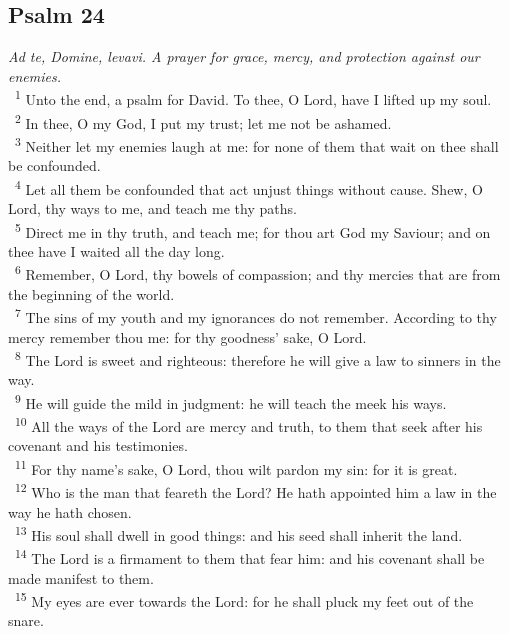 \documentclass[a5paper,12pt]{article}
\begin{document}
\begin{multicols*}{2}
\section{Psalm 24}
\label{sec:org667a478}
\emph{Ad te, Domine, levavi. A prayer for grace, mercy, and protection against our enemies.}\\

~\textsuperscript{1} Unto the end, a psalm for David. To thee, O Lord, have I lifted up my soul.\\
~\textsuperscript{2} In thee, O my God, I put my trust; let me not be ashamed.\\
~\textsuperscript{3} Neither let my enemies laugh at me: for none of them that wait on thee shall be confounded.\\
~\textsuperscript{4} Let all them be confounded that act unjust things without cause. Shew, O Lord, thy ways to me, and teach me thy paths.\\
~\textsuperscript{5} Direct me in thy truth, and teach me; for thou art God my Saviour; and on thee have I waited all the day long.\\
~\textsuperscript{6} Remember, O Lord, thy bowels of compassion; and thy mercies that are from the beginning of the world.\\
~\textsuperscript{7} The sins of my youth and my ignorances do not remember. According to thy mercy remember thou me: for thy goodness' sake, O Lord.\\
~\textsuperscript{8} The Lord is sweet and righteous: therefore he will give a law to sinners in the way.\\
~\textsuperscript{9} He will guide the mild in judgment: he will teach the meek his ways.\\
~\textsuperscript{10} All the ways of the Lord are mercy and truth, to them that seek after his covenant and his testimonies.\\
~\textsuperscript{11} For thy name's sake, O Lord, thou wilt pardon my sin: for it is great.\\
~\textsuperscript{12} Who is the man that feareth the Lord? He hath appointed him a law in the way he hath chosen.\\
~\textsuperscript{13} His soul shall dwell in good things: and his seed shall inherit the land.\\
~\textsuperscript{14} The Lord is a firmament to them that fear him: and his covenant shall be made manifest to them.\\
~\textsuperscript{15} My eyes are ever towards the Lord: for he shall pluck my feet out of the snare.\\

\end{multicols*}
\end{document}
